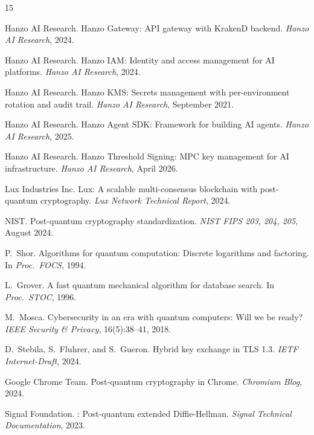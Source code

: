 \begin{thebibliography}{15}

{Hanzo AI Research}.
\newblock Hanzo Gateway: {API} gateway with {KrakenD} backend.
\newblock \emph{Hanzo AI Research}, 2024.

{Hanzo AI Research}.
\newblock Hanzo {IAM}: Identity and access management for {AI} platforms.
\newblock \emph{Hanzo AI Research}, 2024.

{Hanzo AI Research}.
\newblock Hanzo {KMS}: Secrets management with per-environment rotation and audit trail.
\newblock \emph{Hanzo AI Research}, September 2021.

{Hanzo AI Research}.
\newblock Hanzo Agent {SDK}: Framework for building {AI} agents.
\newblock \emph{Hanzo AI Research}, 2025.

{Hanzo AI Research}.
\newblock Hanzo Threshold Signing: {MPC} key management for {AI} infrastructure.
\newblock \emph{Hanzo AI Research}, April 2026.

{Lux Industries Inc}.
\newblock Lux: A scalable multi-consensus blockchain with post-quantum cryptography.
\newblock \emph{Lux Network Technical Report}, 2024.

{NIST}.
\newblock Post-quantum cryptography standardization.
\newblock \emph{NIST FIPS 203, 204, 205}, August 2024.

P.~Shor.
\newblock Algorithms for quantum computation: Discrete logarithms and factoring.
\newblock In \emph{Proc.\ FOCS}, 1994.

L.~Grover.
\newblock A fast quantum mechanical algorithm for database search.
\newblock In \emph{Proc.\ STOC}, 1996.

M.~Mosca.
\newblock Cybersecurity in an era with quantum computers: Will we be ready?
\newblock \emph{IEEE Security \& Privacy}, 16(5):38--41, 2018.

D.~Stebila, S.~Fluhrer, and S.~Gueron.
\newblock Hybrid key exchange in {TLS 1.3}.
\newblock \emph{IETF Internet-Draft}, 2024.

{Google Chrome Team}.
\newblock Post-quantum cryptography in {Chrome}.
\newblock \emph{Chromium Blog}, 2024.

{Signal Foundation}.
: Post-quantum extended {Diffie-Hellman}.
\newblock \emph{Signal Technical Documentation}, 2023.

\end{thebibliography}

